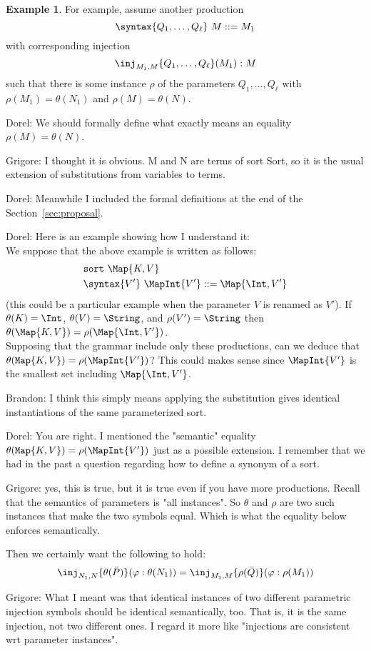 \documentclass{article}
\newcommand\comment[2]{\par\noindent\color{red}#1: #2\color{black}\par\noindent}
\newcommand\dl{\comment{Dorel}}
\newcommand\gr{\comment{Grigore}}
\theoremstyle{definition}
\newtheorem{example}{Example}[section]
\theoremstyle{definition}
\theoremstyle{definition}
\theoremstyle{definition}
\theoremstyle{definition}
\theoremstyle{theorem}
\theoremstyle{theorem}
\theoremstyle{theorem}
\theoremstyle{theorem}
\theoremstyle{theorem}
\newcommand{\sort}{\texttt{sort}}
\begin{document}
\begin{example}\label{consistency-parallel}
For example, assume another production
\[\syntax\{Q_1,\ldots,Q_\ell\}\ M::=M_1\]
with corresponding injection
\[\inj_{M_1,M}\{Q_1,\ldots,Q_\ell\}(M_1):M\]
such that there is some instance \(\rho\) of the parameters
\(Q_1,\ldots,Q_\ell\) with \(\rho(M_1) = \theta(N_1)\) and
\(\rho(M) = \theta(N)\).
\dl{We should formally define what exactly means an equality $\rho(M)=\theta(N)$. }
\gr{I thought it is obvious.  M and N are terms of sort Sort, so it is the usual extension of substitutions from variables to terms.}
\dl{Meanwhile I included the formal definitions at the end of the Section~\ref{sec:proposal}.}
\dl{Here is an example showing how I understand it:
\\
We suppose that the above example is written as follows:
\begin{align*}
&\sort\ \Map{K,V}\\
&\syntax\{V'\}\ \MapInt{V'} ::= \Map{\Int, V'}
\end{align*}
(this could be a particular example when the parameter $V$ is renamed as $V'$).
If \(\theta(K)=\Int\), \(\theta(V)=\String\),
and \(\rho(V')=\String\) then \(\theta(\Map{K,V})=\rho(\Map{\Int,V'})\).
\\
Supposing that the grammar include only these productions, can we deduce that
\(\theta({\tt Map}\{K,V\})=\rho(\MapInt{V'})\)?
This could makes sense since \(\MapInt{V'}\) is the smallest set including \(\Map{\Int,V'}\).
}
\comment{Brandon}{
I think this simply means applying the substitution gives identical instantiations
of the same parameterized sort.
}
\dl{You are right. I mentioned the "semantic" equality \(\theta({\tt Map}\{K,V\})=\rho(\MapInt{V'})\) just as a possible extension. I remember that we had in the past a question regarding how to define a synonym of a sort.}
\gr{yes, this is true, but it is true even if you have more productions.  Recall that the semantics of parameters is "all instances".  So $\theta$ and $\rho$ are two such instances that make the two symbols equal.  Which is what the equality below enforces semantically.}
Then we certainly want the following to hold:
\[\inj_{N_1,N}\{\theta(\bar{P})\}(\varphi:\theta(N_1))
 = \inj_{M_1,M}\{\rho(\bar{Q})\}(\varphi:\rho(M_1))\]
\end{example}
\gr{What I meant was that identical instances of two different parametric injection symbols should be identical semantically, too.  That is, it is the same injection, not two different ones.  I regard it more like "injections are consistent wrt parameter instances".}
\end{document}
